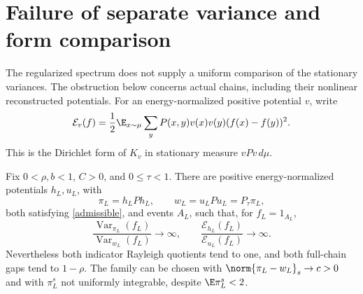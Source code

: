 \section{Failure of separate variance and form comparison}\label{separatecomparison}
The regularized spectrum does not supply a uniform comparison of the
stationary variances. The obstruction below concerns actual chains,
including their nonlinear reconstructed potentials. For an energy-normalized
positive potential $v$, write
\[
 \mathcal E_v(f)=\frac12\E_{x\sim\mu}\sum_y
 P(x,y)v(x)v(y)(f(x)-f(y))^2.
\]
This is the Dirichlet form of $K_v$ in stationary measure $vPv\,d\mu$.

\begin{theorem}\label{separatecomparisonfailure}
Fix $0<\rho,b<1$, $C>0$, and $0\leq\tau<1$. There are positive
energy-normalized potentials $h_L,u_L$, with
\[
 \pi_L=h_LPh_L,\qquad w_L=u_LPu_L=P_\tau\pi_L,
\]
both satisfying \eqref{admissible}, and events $A_L$, such that, for
$f_L=1_{A_L}$,
\[
 \frac{\operatorname{Var}_{\pi_L}(f_L)}{\operatorname{Var}_{w_L}(f_L)}
 \longrightarrow\infty,\qquad
 \frac{\mathcal E_{h_L}(f_L)}{\mathcal E_{u_L}(f_L)}
 \longrightarrow\infty.
\]
Nevertheless both indicator Rayleigh quotients tend to one, and both
full-chain gaps tend to $1-\rho$. The family can be chosen with
$\norm{\pi_L-w_L}_s\to c>0$ and with $\pi_L^s$ not uniformly
integrable, despite $\E\pi_L^s<2$.
\end{theorem}
